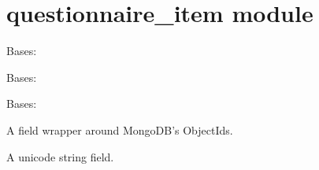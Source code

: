 \documentclass[letterpaper,10pt,english]{sphinxmanual}
\begin{document}
\chapter{questionnaire\_item module}
\label{\detokenize{questionnaire_item:questionnaire-item-module}}\label{\detokenize{questionnaire_item::doc}}\label{\detokenize{questionnaire_item:module-questionnaire_item}}

\begin{fulllineitems}
\label{\detokenize{questionnaire_item:questionnaire_item.QuestionnaireItem}}
Bases: 

\begin{fulllineitems}
\label{\detokenize{questionnaire_item:questionnaire_item.QuestionnaireItem.DoesNotExist}}
Bases: 

\end{fulllineitems}


\begin{fulllineitems}
\label{\detokenize{questionnaire_item:questionnaire_item.QuestionnaireItem.MultipleObjectsReturned}}
Bases: 

\end{fulllineitems}


\begin{fulllineitems}
\label{\detokenize{questionnaire_item:questionnaire_item.QuestionnaireItem.id}}
A field wrapper around MongoDB's ObjectIds.

\end{fulllineitems}


\begin{fulllineitems}
\label{\detokenize{questionnaire_item:questionnaire_item.QuestionnaireItem.negative_phrasing}}
A unicode string field.


\end{fulllineitems}
\end{fulllineitems}
\end{document}
